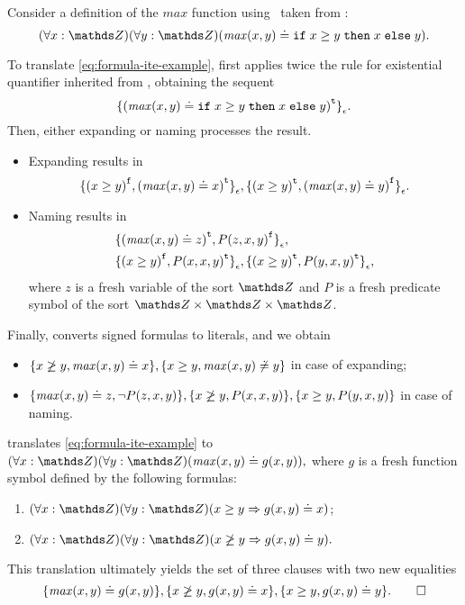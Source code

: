 \begin{example*} Consider a definition of the $\mathit{max}$ function using \ITE\ taken from \cite{VampireAndFOOL}:
\begin{equation}\label{eq:formula-ite-example}
  (\forall x:\Z)(\forall y:\Z)(\mathit{max}(x, y) \eql \ite{x \geq y}{x}{y}).
\end{equation}

To translate \eqref{eq:formula-ite-example}, \nfcnf{} first applies twice the rule for existential quantifier inherited from \newcnf, obtaining the sequent $${ \{ {(\mathit{max}(x, y) \doteq \mathtt{if}\;{x \geq y}\;\allowbreak\mathtt{then}\;{x}\;\allowbreak\mathtt{else}\;{y})}^{\mathtt{t}} \} }_{\epsilon}.$$ Then, either expanding or naming processes the result.
\begin{itemize}
  \item Expanding results in $${ \{ {(x \geq y)}^{\mathtt{f}}, {(\mathit{max}(x,y) \doteq x)}^{\mathtt{t}} \} }_{\epsilon},
  { \{ {(x \geq y)}^{\mathtt{t}}, {(\mathit{max}(x,y) \doteq y)}^{\mathtt{f}} \} }_{\epsilon}.$$
  \item Naming results in
  \begin{align*}
  &{ \{ {(\mathit{max}(x,y)\doteq z)}^{\mathtt{t}}, {P(z, x, y)}^{\mathtt{f}} \} }_{\epsilon},\\
  &{ \{ {(x \geq y)}^{\mathtt{f}}, {P(x,x,y)}^{\mathtt{t}} \} }_{\epsilon},
  { \{ {(x \geq y)}^{\mathtt{t}}, {P(y,x,y)}^{\mathtt{t}} \} }_{\epsilon},
  \end{align*}
  where $z$ is a fresh variable of the sort $\Z$ and $P$ is a fresh predicate symbol of the sort $\Z \times \Z \times \Z$.
\end{itemize}

Finally, \newcnf{} converts signed formulas to literals, and we obtain
\begin{itemize}
  \item $\{ x \not\geq y, \mathit{max}(x,y) \doteq x \}, \{ x \geq y, \mathit{max}(x,y) \not\doteq y \}$ in case of expanding;
  \item $\{ \mathit{max}(x,y)\doteq z, \neg P(z, x, y) \},
  \{ x \not\geq y, P(x,x,y) \},
  \{ x \geq y, P(y,x,y) \}$ in case of naming.
\end{itemize}

\oldcnf{} translates \eqref{eq:formula-ite-example} to $(\forall x:\Z)(\forall y:\Z)(\mathit{max}(x, y) \eql g(x, y)),$ where $g$ is a fresh function symbol defined by the following formulas:
\begin{enumerate}
  \item $(\forall x:\Z)(\forall y:\Z)(x \geq y \implies g(x, y) \eql x)$;
  \item $(\forall x:\Z)(\forall y:\Z)(x \not\geq y \implies g(x, y) \eql y).$
\end{enumerate}
This translation ultimately yields the set of three clauses with two new equalities
\begin{equation*}
\{\mathit{max}(x,y) \eql g(x,y)\}, \{x \not\geq y, g(x,y) \eql x\}, \{x \geq y, g(x,y) \eql y\}.\QED
\end{equation*}
\end{example*}


